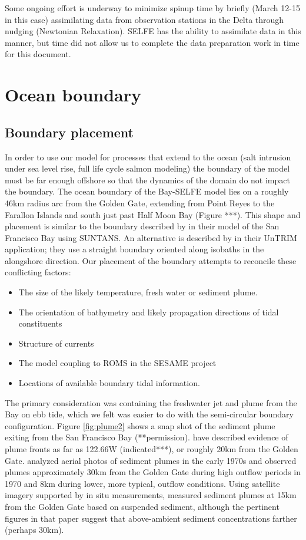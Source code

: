Some ongoing effort is underway to minimize spinup time by briefly (March 12-15 in this case) assimilating data from observation stations in the Delta through nudging (Newtonian Relaxation). SELFE has the ability to assimilate data in this manner, but time did not allow us to complete the data preparation work in time for this document. 

\section{Ocean boundary}
  \label{ocean-boundary}

\subsection{Boundary placement}
In order to use our model for processes that extend to the ocean (salt intrusion under sea level rise, full life cycle salmon modeling) the boundary of the model must be far enough offshore so that the dynamics of the domain do not impact the boundary. The ocean boundary of the Bay-SELFE model lies on a roughly 46km radius arc from the Golden Gate, extending from Point Reyes to the Farallon Islands and south just past Half Moon Bay (Figure ***). This shape and placement is similar to the boundary described by \citet{Chua2011} in their  model of the San Francisco Bay using SUNTANS. An alternative is described by \citet{MacWilliams08,MacWilliams09} in their UnTRIM application; they use a straight boundary oriented along isobaths in the alongshore direction.
%
Our placement of the boundary attempts to reconcile these conflicting factors:
\begin{itemize}
\item The size of the likely temperature, fresh water or sediment plume.
\item The orientation of bathymetry and likely propagation directions of tidal constituents
\item Structure of currents
\item The model coupling to ROMS in the SESAME project
\item Locations of available boundary tidal information.
\end{itemize}

The primary consideration was containing the freshwater jet and plume from the Bay on ebb tide, which we felt was easier to do with the semi-circular boundary configuration. Figure \ref{fig:plume2} shows a snap shot of the sediment plume exiting from the San Francisco Bay (**permission). \citet{Hurst08} have described evidence of plume fronts as far as 122.66\textdegree W (indicated***), or roughly 20km from the Golden Gate.
\citet{Carlson74} analyzed aerial photos of sediment plumes in the early 1970s and observed plumes approximately 30km from the Golden Gate during high outflow periods in 1970 and 8km during lower, more typical, outflow conditions. Using satellite imagery supported by in situ measurements, \cite{Ruhl01} measured sediment plumes at 15km from the Golden Gate based on suspended sediment, although the pertinent figures in that paper suggest that above-ambient sediment concentrations farther (perhaps 30km). 


